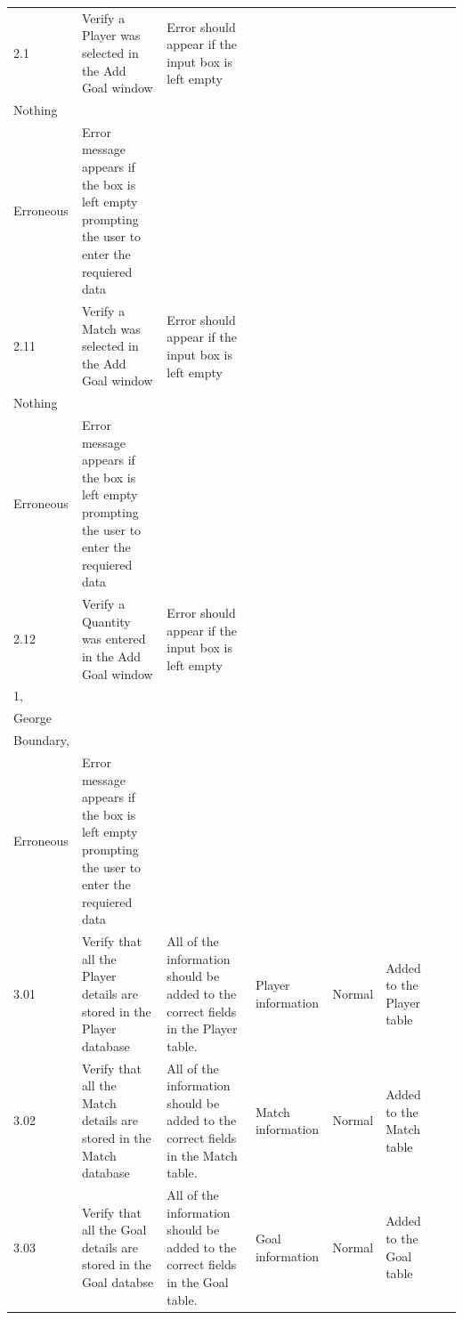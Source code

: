 \begin{table}[]
\begin{longtable}{|p{1cm}|p{2.5cm}|p{2.5cm}|p{1.5cm}|p{1.5cm}|p{2cm}|p{1cm}|p{1cm}|}
2.1 & Verify a Player was selected in the Add Goal window & Error should appear if the input box is left empty & \begin{tabular}[c]{@{}l@{}}West,\\ Nothing\end{tabular} & \begin{tabular}[c]{@{}l@{}}Normal,\\ Erroneous\end{tabular} & Error message appears if the box is left empty prompting the user to enter the requiered data &  &  \\ \hline
2.11 & Verify a Match was selected in the Add Goal window & Error should appear if the input box is left empty & \begin{tabular}[c]{@{}l@{}}Milton,\\ Nothing\end{tabular} & \begin{tabular}[c]{@{}l@{}}Normal,\\ Erroneous\end{tabular} & Error message appears if the box is left empty prompting the user to enter the requiered data &  &  \\ \hline
2.12 & Verify a Quantity was entered in the Add Goal window & Error should appear if the input box is left empty & \begin{tabular}[c]{@{}l@{}}2,\\ 1,\\ George\end{tabular} & \begin{tabular}[c]{@{}l@{}}Normal,\\ Boundary,\\ Erroneous\end{tabular} & Error message appears if the box is left empty prompting the user to enter the requiered data &  &  \\ \hline
3.01 & Verify that all the Player details are stored in the Player database & All of the information should be added to the correct fields in the Player table. & Player information & Normal & Added to the Player table &  &  \\ \hline
3.02 & Verify that all the Match details are stored in the Match database & All of the information should be added to the correct fields in the Match table. & Match information & Normal & Added to the Match table &  &  \\ \hline
3.03 & Verify that all the Goal details are stored in the Goal databse & All of the information should be added to the correct fields in the Goal table. & Goal information & Normal & Added to the Goal table &  &  \\ \hline

\end{longtable}
\end{table}

